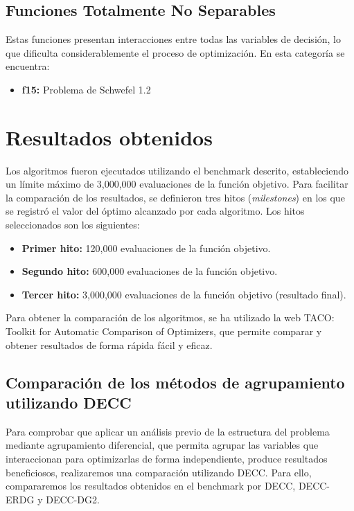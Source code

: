 \subsection{Funciones Totalmente No Separables}

Estas funciones presentan interacciones entre todas las variables de decisión, lo que dificulta considerablemente el proceso de optimización. En esta categoría se encuentra:
\begin{itemize}
    \item \textbf{f15:} Problema de Schwefel 1.2
\end{itemize}	

\section{Resultados obtenidos}

Los algoritmos fueron ejecutados utilizando el benchmark descrito, estableciendo un límite máximo de 3,000,000 evaluaciones de la función objetivo. Para facilitar la comparación de los resultados, se definieron tres hitos (\textit{milestones}) en los que se registró el valor del óptimo alcanzado por cada algoritmo. Los hitos seleccionados son los siguientes:

\begin{itemize}
    \item \textbf{Primer hito:} 120,000 evaluaciones de la función objetivo.
    \item \textbf{Segundo hito:} 600,000 evaluaciones de la función objetivo.
    \item \textbf{Tercer hito:} 3,000,000 evaluaciones de la función objetivo (resultado final).
\end{itemize}

Para obtener la comparación de los algoritmos, se ha utilizado la web TACO: Toolkit for Automatic Comparison of Optimizers, que permite comparar y obtener resultados de forma rápida fácil y eficaz.

\subsection{Comparación de los métodos de agrupamiento utilizando DECC}

Para comprobar que aplicar un análisis previo de la estructura del problema mediante agrupamiento diferencial, que permita agrupar las variables que interaccionan para optimizarlas de forma independiente, produce resultados beneficiosos, realizaremos una comparación utilizando DECC. Para ello, compararemos los resultados obtenidos en el benchmark por DECC, DECC-ERDG y DECC-DG2.

